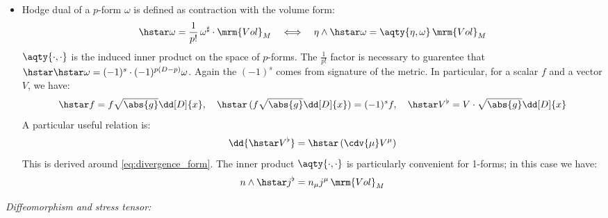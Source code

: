 \documentclass[a4paper
	,10pt
]{article}
\begin{document}
\begin{itemize}
	\item Hodge dual of a $p$-form $\omega$ is defined as contraction with the volume form:
	\begin{equation}
		\hstar\omega
		= \frac{1}{p!}\,
			\omega^\sharp \cdot \mrm{Vol}_M
	\quad\Longleftrightarrow\quad
		\eta\wedge \hstar\omega
		= \aqty{\eta,\omega} \,\mrm{Vol}_M
	\end{equation}
	$\aqty{\cdot,\cdot}$ is the induced inner product on the space of $p$-forms. 
	The $\frac{1}{p!}$ factor is necessary to guarentee that $\hstar\hstar\omega = (-1)^s\cdot(-1)^{p(D-p)} \omega$. Again the $(-1)^s$ comes from signature of the metric. In particular, for a scalar $f$ and a vector $V$, we have:
	\begin{equation}
		\hstar f
		= f\sqrt{\abs{g}} \dd[D]{x},
	\quad
		\hstar\,(f\sqrt{\abs{g}} \dd[D]{x})
		= (-1)^s f,
	\quad
		\hstar V^\flat
		= V\cdot \sqrt{\abs{g}} \dd[D]{x}
	\end{equation}
	A particular useful relation is:
	\begin{equation}
		\dd{\hstar V^\flat}
		= \hstar\,(\cdv{\mu} V^\mu)
	\end{equation}
	This is derived around \eqref{eq:divergence_form}. The inner product $\aqty{\cdot,\cdot}$ is particularly convenient for 1-forms; in this case we have:
	\begin{equation}
		n \wedge\hstar j^\flat
		= n_\mu j^\mu \,\mrm{Vol}_M
	\end{equation}
	
	\end{itemize}
\textit{Diffeomorphism and stress tensor:}
	
\end{document}
